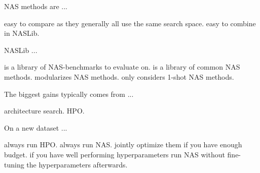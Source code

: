 \documentclass{exam}
\begin{document}
\begin{questions}
\question NAS methods are ...
\begin{choices}
    \choice easy to compare as they generally all use the same search space.
    \choice easy to combine in NASLib. %
\end{choices}

\question NASLib ...
\begin{choices}
    \choice is a library of NAS-benchmarks to evaluate on. %
    \choice is a library of common NAS methods. %
    \choice modularizes NAS methods. %
    \choice only considers 1-shot NAS methods.
\end{choices}

\question The biggest gains typically comes from ...
\begin{choices}
    \choice architecture search.
    \choice HPO. %
\end{choices}

\question On a new dataset ...
\begin{choices}
    \choice always run HPO. %
    \choice always run NAS.
    \choice jointly optimize them if you have enough budget. %
    \choice if you have well performing hyperparameters run NAS without fine-tuning the hyperparameters afterwards.
\end{choices}
	\end{questions}
\end{document}
